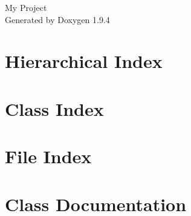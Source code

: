 \documentclass[twoside]{book}
\newcommand{\+}{\discretionary{\mbox{\scriptsize$\hookleftarrow$}}{}{}}
\newcommand{\clearemptydoublepage}{%
    \newpage{\pagestyle{empty}\cleardoublepage}%
  }
\begin{document}
  \raggedbottom
    \hypersetup{pageanchor=false,
                bookmarksnumbered=true,
                pdfencoding=unicode
               }
  \begin{titlepage}
  \vspace*{7cm}
  \begin{center}%
  {\Large My Project}\\
  \vspace*{1cm}
  {\large Generated by Doxygen 1.9.4}\\
  \end{center}
  \end{titlepage}
  \clearemptydoublepage
  \tableofcontents
  \clearemptydoublepage
  \hypersetup{pageanchor=true}
\chapter{Hierarchical Index}

\chapter{Class Index}

\chapter{File Index}

\chapter{Class Documentation}
































\end{document}
